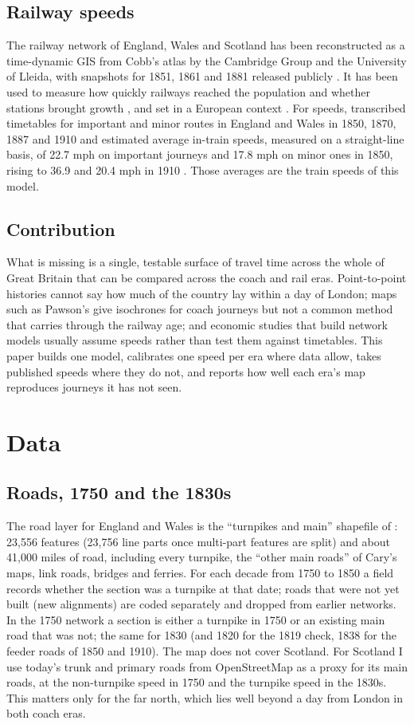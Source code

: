 \documentclass[11pt,a4paper]{article}
\begin{document}
\subsection{Railway speeds}
The railway network of England, Wales and Scotland has been reconstructed as a time-dynamic GIS from Cobb's atlas by the Cambridge Group and the University of Lleida, with snapshots for 1851, 1861 and 1881 released publicly \citep{marti2017,satchell2023}. It has been used to measure how quickly railways reached the population and whether stations brought growth \citep{gregory2010,bogart2022}, and set in a European context \citep{marti2013}. For speeds, \citet{leunig2006} transcribed timetables for important and minor routes in England and Wales in 1850, 1870, 1887 and 1910 and estimated average in-train speeds, measured on a straight-line basis, of 22.7 mph on important journeys and 17.8 mph on minor ones in 1850, rising to 36.9 and 20.4 mph in 1910 \citep[Table~2]{leunig2006}. Those averages are the train speeds of this model.

\subsection{Contribution}
What is missing is a single, testable surface of travel time across the whole of Great Britain that can be compared across the coach and rail eras. Point-to-point histories cannot say how much of the country lay within a day of London; maps such as Pawson's give isochrones for coach journeys but not a common method that carries through the railway age; and economic studies that build network models usually assume speeds rather than test them against timetables. This paper builds one model, calibrates one speed per era where data allow, takes published speeds where they do not, and reports how well each era's map reproduces journeys it has not seen.

\section{Data}\label{sec:data}
\subsection{Roads, 1750 and the 1830s}
The road layer for England and Wales is the ``turnpikes and main'' shapefile of \citet{rosevear2023tp}: 23,556 features (23,756 line parts once multi-part features are split) and about 41,000 miles of road, including every turnpike, the ``other main roads'' of Cary's maps, link roads, bridges and ferries. For each decade from 1750 to 1850 a field records whether the section was a turnpike at that date; roads that were not yet built (new alignments) are coded separately and dropped from earlier networks. In the 1750 network a section is either a turnpike in 1750 or an existing main road that was not; the same for 1830 (and 1820 for the 1819 check, 1838 for the feeder roads of 1850 and 1910). The map does not cover Scotland. For Scotland I use today's trunk and primary roads from OpenStreetMap as a proxy for its main roads, at the non-turnpike speed in 1750 and the turnpike speed in the 1830s. This matters only for the far north, which lies well beyond a day from London in both coach eras.
\end{document}
